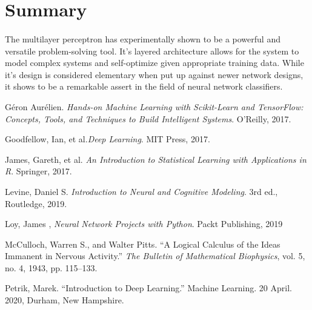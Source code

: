 \documentclass[12pt,letterpaper]{article}
\begin{document}

\section{Summary}

\paragraph*{}The multilayer perceptron has experimentally shown to be a powerful and versatile problem-solving tool. It's layered architecture allows for the system to model complex systems and self-optimize given appropriate training data. While it's design is considered elementary when put up against newer network designs, it shows to be a remarkable assert in the field of neural network classifiers.




\begin{thebibliography}{9}


Géron Aurélien. \textit{Hands-on Machine Learning with Scikit-Learn and TensorFlow: Concepts, Tools, and Techniques to Build Intelligent Systems}. O'Reilly, 2017.

Goodfellow, Ian, et al.\textit{Deep Learning}. MIT Press, 2017.

James, Gareth, et al. \textit{An Introduction to Statistical Learning with Applications in R}. Springer, 2017.

Levine, Daniel S. \textit{Introduction to Neural and Cognitive Modeling}. 3rd ed., Routledge, 2019.

Loy, James , \textit{Neural Network Projects with Python}. Packt Publishing, 2019

McCulloch, Warren S., and Walter Pitts. “A Logical Calculus of the Ideas Immanent in Nervous Activity.” \textit{The Bulletin of Mathematical Biophysics}, vol. 5, no. 4, 1943, pp. 115–133.

Petrik, Marek. “Introduction to Deep Learning.” Machine Learning. 20 April. 2020, Durham, New Hampshire.

\end{thebibliography}

\end{document}
